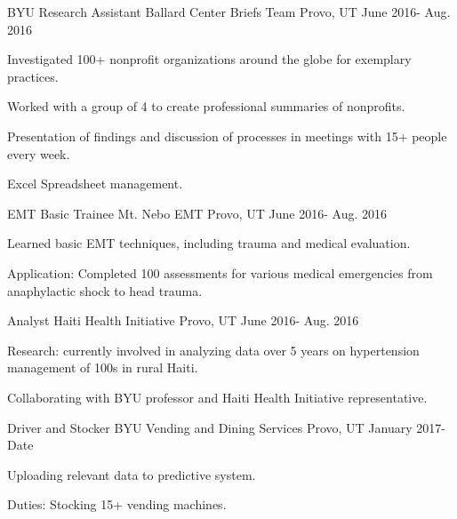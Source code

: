 \begin{cventries}

\cventry
    {BYU Research Assistant }
    {Ballard Center Briefs Team}
    {Provo, UT}
    {June 2016- Aug. 2016}
    {
      \begin{cvitems}
        \item {Investigated 100+ nonprofit organizations around the globe for exemplary practices.}
        \item {Worked with a group of 4 to create professional summaries of nonprofits.}
        \item {Presentation of findings and discussion of processes in meetings with 15+ people every week.}
        \item {Excel Spreadsheet management.}        
      \end{cvitems}
    }
    \cventry
    {EMT Basic Trainee }
    {Mt. Nebo EMT}
    {Provo, UT}
    {June 2016- Aug. 2016}
    {
      \begin{cvitems}
        \item {Learned basic EMT techniques, including trauma and medical evaluation.}
        \item {Application: Completed 100 assessments for various medical emergencies from anaphylactic  shock to head trauma. }       
      \end{cvitems}
    }
    \cventry
    {Analyst}
    {Haiti Health Initiative}
    {Provo, UT}
    {June 2016- Aug. 2016}
    {
      \begin{cvitems}
        \item {Research: currently involved in analyzing data over 5 years on hypertension management of 100s in rural Haiti.}
        \item {Collaborating with BYU professor and Haiti Health Initiative representative.}      
      \end{cvitems}
    }
  \cventry
    {Driver and Stocker}
    {BYU Vending and Dining Services}
    {Provo, UT}
    {January 2017- Date}
    {
      \begin{cvitems}
        \item {Uploading relevant data to predictive system.}
        \item {Duties: Stocking 15+ vending machines.}

\end{cvitems}}
\end{cventries}
